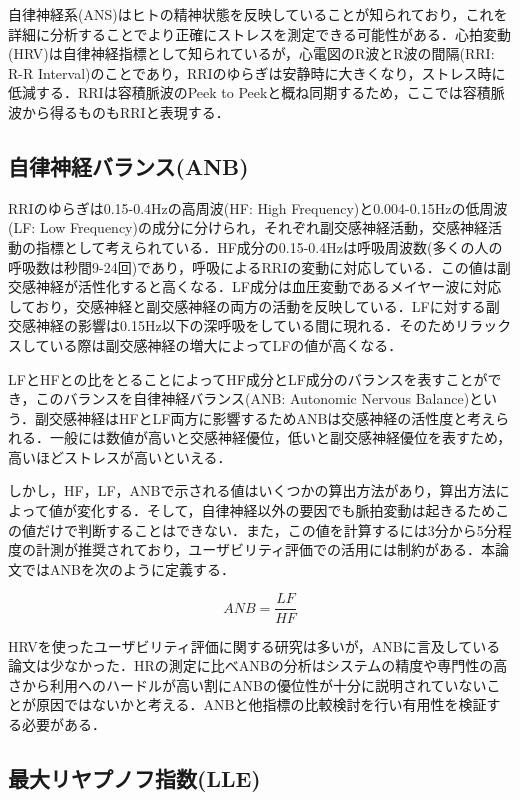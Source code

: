 自律神経系(ANS)はヒトの精神状態を反映していることが知られており，これを詳細に分析することでより正確にストレスを測定できる可能性がある．心拍変動(HRV)は自律神経指標として知られているが，心電図のR波とR波の間隔(RRI: R-R Interval)のことであり，RRIのゆらぎは安静時に大きくなり，ストレス時に低減する\cite{nakagawa}．RRIは容積脈波のPeek to Peekと概ね同期するため，ここでは容積脈波から得るものもRRIと表現する．

\subsection{自律神経バランス(ANB)}

RRIのゆらぎは0.15-0.4Hzの高周波(HF: High Frequency)と0.004-0.15Hzの低周波(LF: Low Frequency)の成分に分けられ，それぞれ副交感神経活動，交感神経活動の指標として考えられている\cite{yamaguchi}．HF成分の0.15-0.4Hzは呼吸周波数(多くの人の呼吸数は秒間9-24回)であり，呼吸によるRRIの変動に対応している．この値は副交感神経が活性化すると高くなる\cite{lehrer}．LF成分は血圧変動であるメイヤー波に対応しており，交感神経と副交感神経の両方の活動を反映している．LFに対する副交感神経の影響は0.15Hz以下の深呼吸をしている間に現れる．そのためリラックスしている際は副交感神経の増大によってLFの値が高くなる\cite{trytech}．

LFとHFとの比をとることによってHF成分とLF成分のバランスを表すことができ，このバランスを自律神経バランス(ANB: Autonomic Nervous Balance)という．副交感神経はHFとLF両方に影響するためANBは交感神経の活性度と考えられる\cite{yamaguchi}．一般には数値が高いと交感神経優位，低いと副交感神経優位を表すため，高いほどストレスが高いといえる．

しかし，HF，LF，ANBで示される値はいくつかの算出方法があり，算出方法によって値が変化する．そして，自律神経以外の要因でも脈拍変動は起きるためこの値だけで判断することはできない．また，この値を計算するには3分から5分程度の計測が推奨されており\cite{nakagawa}，ユーザビリティ評価での活用には制約がある．本論文ではANBを次のように定義する．

\begin{equation}
ANB= \frac{LF}{HF} 
\end{equation}

HRVを使ったユーザビリティ評価に関する研究は多いが，ANBに言及している論文は少なかった\cite{lei2020}\cite{wollmann}．HRの測定に比べANBの分析はシステムの精度や専門性の高さから利用へのハードルが高い割にANBの優位性が十分に説明されていないことが原因ではないかと考える．ANBと他指標の比較検討を行い有用性を検証する必要がある．

\subsection{最大リヤプノフ指数(LLE)}

